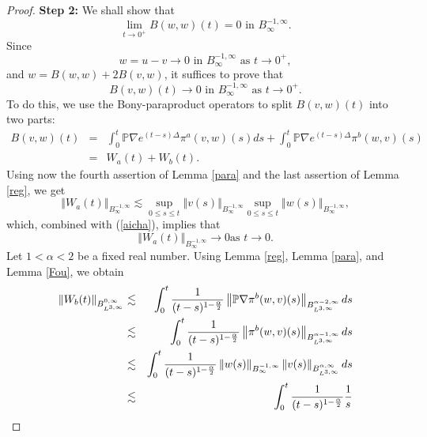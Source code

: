 \documentclass[11pt]{amsart}%
\theoremstyle{plain}
\numberwithin{equation}{section}
\begin{document}
\begin{proof}
\par\noindent\textbf{Step 2:} We shall  show that
\begin{equation} \label{claim1}
\lim_{t\to 0^+} B(w,w)(t)=0  \text{ in } B_{\infty }^{-1,\infty }.
\end{equation}
Since
\begin{equation}\label{aicha}
w=u-v\to 0 \text{ in } B_{\infty }^{-1,\infty } \text{ as } t\to 0^+,
\end{equation}
and $w=B(w,w)+2B(v,w)$, it suffices to prove that
\begin{equation}\label{claim}
B(v,w)(t)\to 0  \text{ in } B_{\infty }^{-1,\infty } \text{ as } t\to 0^+   .
\end{equation}
To do this, we use  the Bony-paraproduct operators to split $B(v,w)(t)$ into two parts:
\begin{eqnarray*}
B(v,w)(t) &=&\int_{0}^{t}\mathbb{P}\nabla e^{(t-s)\Delta }\pi
^{a}(v,w)(s)ds+\int_{0}^{t}\mathbb{P}\nabla e^{(t-s)\Delta }\pi ^{b}(w,v)(s)
\\
&=&W_a(t)+W_{b}(t).
\end{eqnarray*}%
Using now the fourth assertion of Lemma \ref{para} and the last assertion of Lemma \ref{reg}, we get
\[
\left\Vert W_a(t)\right\Vert _{B_{\infty }^{-1,\infty }}\lesssim
\sup_{0\leq s\leq t}\left\Vert v(s)\right\Vert _{B_{\infty }^{-1,\infty
}}\sup_{0\leq s\leq t}\left\Vert w(s)\right\Vert _{B_{\infty }^{-1,\infty
}},
\]%
which, combined with (\ref{aicha}),  implies that
\begin{equation}\label{claim2}
\left\Vert W_a(t)\right\Vert _{B_{\infty }^{-1,\infty }}\rightarrow 0\text{
as }t\rightarrow 0.
\end{equation}
Let $1<\alpha <2$ be a fixed real number. Using  Lemma \ref{reg}, Lemma \ref{para}, and Lemma \ref{Fou}, we obtain
\begin{eqnarray*}
\left\Vert W_{b}(t)\right\Vert _{B_{L^{3,\infty }}^{0,\infty }} &\lesssim
&\int_{0}^{t}\frac{1}{(t-s)^{1-\frac{\alpha }{2}}}\left\Vert \mathbb{P}%
\nabla \pi ^{b}(w,v)(s)\right\Vert _{B_{L^{3,\infty }}^{\alpha -2,\infty }}ds
\\
&\lesssim &\int_{0}^{t}\frac{1}{(t-s)^{1-\frac{\alpha }{2}}}\left\Vert \pi ^{b}(w,v)(s)\right\Vert _{B_{L^{3,\infty }}^{\alpha -1,\infty }}ds \\
&\lesssim &\int_{0}^{t}\frac{1}{(t-s)^{1-\frac{\alpha }{2}}}\left\Vert
w(s)\right\Vert _{B_{\infty }^{-1,\infty }}\left\Vert
v(s)\right\Vert _{B_{L^{3,\infty }}^{\alpha ,\infty }}ds \\
&\lesssim &\int_{0}^{t}\frac{1}{(t-s)^{1-\frac{\alpha }{2}}}\frac{1}{s^{%
}}
\end{eqnarray*}
\end{proof}
\end{document}
